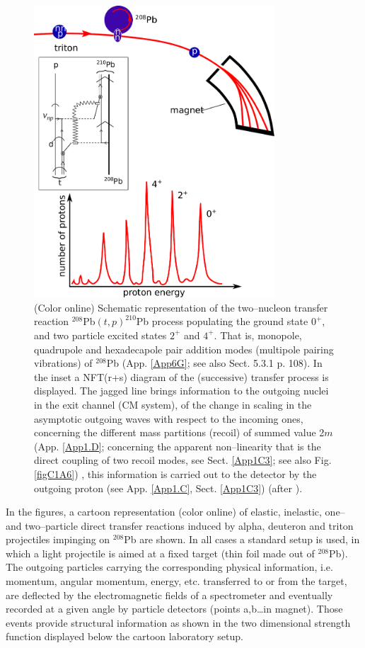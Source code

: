 \begin{figure}
\centerline {
\includegraphics*[width=9cm]{introduccion/figs/figintro3}
}
\caption{(Color online) Schematic representation of the two--nucleon transfer reaction $^{208}$Pb$(t,p)^{210}$Pb process populating the ground state $0^+$, and two particle excited states $2^+$ and $4^+$.  That is, monopole, quadrupole and hexadecapole pair addition modes (multipole pairing vibrations) of $^{208}$Pb   (App. \ref{App6G}; see also \cite{Brink:05} Sect. 5.3.1 p. 108). In the inset a NFT(r+s) diagram of the (successive) transfer process is displayed. The jagged line brings information to the outgoing nuclei in the exit channel (CM system), of the change in scaling in the asymptotic outgoing waves with respect to the incoming ones, concerning the different mass partitions (recoil) of summed value 2$m$ (App. \ref{App1.D}; concerning the apparent non--linearity that is the direct coupling of two recoil modes, see Sect. \ref{App1C3}; see also Fig. \ref{figC1A6}) , this information is carried out to the detector by the outgoing proton (see App. \ref{App1.C}, Sect. \ref{App1C3}) (after \cite{Mottelson:76b}).}
\label{figintro3}
\end{figure}

In the figures, a cartoon representation (color online) of elastic, inelastic, one-- and two--particle direct transfer reactions induced by alpha, deuteron and triton  projectiles impinging on $^{208}$Pb are shown. In all cases a standard setup is used, in which a light projectile is aimed at a fixed target (thin foil made out of $^{208}$Pb). The outgoing particles carrying the corresponding physical information, i.e. momentum, angular momentum, energy, etc. transferred to or from the target, are deflected by the electromagnetic fields of a spectrometer and eventually recorded at a given angle by particle detectors (points a,b\dots in magnet). Those events provide structural information as shown in the two dimensional strength function displayed below the cartoon laboratory setup. 

